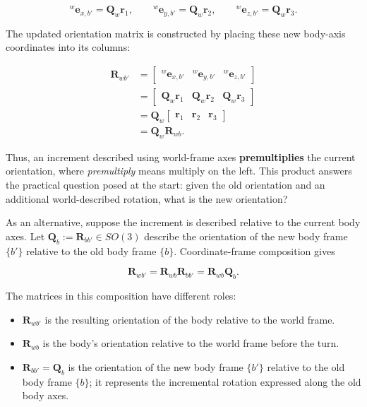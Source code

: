 \documentclass[
  australian,
  12pt,
  letterpaper,
  DIV=11,
  numbers=noendperiod,
  twoside]{scrreprt}
\providecommand{\tightlist}{%
  \setlength{\itemsep}{0pt}\setlength{\parskip}{0pt}}
\begin{document}
\[
{}^{w}\mathbf e_{x,b'}
=
\mathbf Q_w\mathbf r_1,
\qquad
{}^{w}\mathbf e_{y,b'}
=
\mathbf Q_w\mathbf r_2,
\qquad
{}^{w}\mathbf e_{z,b'}
=
\mathbf Q_w\mathbf r_3.
\]

The updated orientation matrix is constructed by placing these new
body-axis coordinates into its columns:

\[
\begin{aligned}
\mathbf R_{wb'}
&=
\begin{bmatrix}
{}^{w}\mathbf e_{x,b'}&
{}^{w}\mathbf e_{y,b'}&
{}^{w}\mathbf e_{z,b'}
\end{bmatrix}\\
&=
\begin{bmatrix}
\mathbf Q_w\mathbf r_1&
\mathbf Q_w\mathbf r_2&
\mathbf Q_w\mathbf r_3
\end{bmatrix}\\
&=
\mathbf Q_w
\begin{bmatrix}
\mathbf r_1&\mathbf r_2&\mathbf r_3
\end{bmatrix}\\
&=
\boxed{\mathbf Q_w\mathbf R_{wb}}.
\end{aligned}
\]

Thus, an increment described using world-frame axes
\textbf{premultiplies} the current orientation, where \emph{premultiply}
means multiply on the left. This product answers the practical question
posed at the start: given the old orientation and an additional
world-described rotation, what is the new orientation?

As an alternative, suppose the increment is described relative to the
current body axes. Let
\(\mathbf Q_b\mathrel{:=}\mathbf R_{bb'}\in SO(3)\) describe the
orientation of the new body frame \(\{b'\}\) relative to the old body
frame \(\{b\}\). Coordinate-frame composition gives

\[
\boxed{
\mathbf R_{wb'}
=
\mathbf R_{wb}\mathbf R_{bb'}
=
\mathbf R_{wb}\mathbf Q_b
}.
\]

The matrices in this composition have different roles:

\begin{itemize}
\tightlist
\item
  \(\mathbf R_{wb'}\) is the resulting orientation of the body relative
  to the world frame.
\item
  \(\mathbf R_{wb}\) is the body's orientation relative to the world
  frame before the turn.
\item
  \(\mathbf R_{bb'}=\mathbf Q_b\) is the orientation of the new body
  frame \(\{b'\}\) relative to the old body frame \(\{b\}\); it
  represents the incremental rotation expressed along the old body axes.
\end{itemize}
\end{document}
